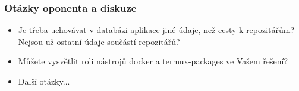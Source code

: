 \documentclass[10pt,xcolor=pdflatex]{beamer}
\begin{document}
\begin{frame}\frametitle{Otázky oponenta a diskuze}

    \begin{itemize}
        \item{Je třeba uchovávat v databázi aplikace jiné údaje, než cesty k repozitářům? Nejsou už ostatní údaje součástí repozitářů?}
        \item{Můžete vysvětlit roli nástrojů docker a termux-packages ve Vašem řešení?}
        \item{Další otázky...}
    \end{itemize}
    \vspace{0.7cm}
    \begin{figure}[b]
    \end{figure}
\end{frame}
\end{document}
